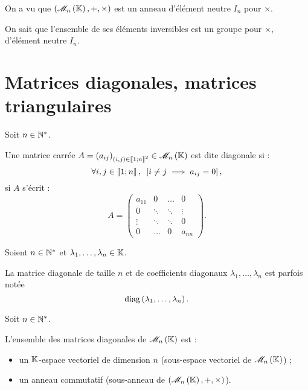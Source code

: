 \begin{dem}
On a vu que \(\anneau{\M{n}}\) est un anneau d'élément neutre \(I_n\) pour \(\times\).

On sait que l'ensemble de ses éléments inversibles est un groupe pour \(\times\), d'élément neutre \(I_n\).
\end{dem}

\section{Matrices diagonales, matrices triangulaires}

\begin{defi}
Soit \(n\in\mathbb{N}^*\).

Une matrice carrée \(A=\paren{a_{ij}}_{\paren{i,j}\in\interventierii{1}{n}^2}\in\M{n}\) est dite diagonale si : \[\quantifs{\forall i,j\in\interventierii{1}{n}}\croch{i\not=j\imp a_{ij}=0},\] \cad si \(A\) s'écrit : \[A=\begin{pmatrix}
a_{11} & 0 & \dots & 0 \\
0 & \ddots & \ddots & \vdots \\
\vdots & \ddots & \ddots & 0 \\
0 & \dots & 0 & a_{nn}
\end{pmatrix}.\]
\end{defi}

\begin{nota}
Soient \(n\in\mathbb{N}^*\) et \(\lambda_1,\dots,\lambda_n\in\mathbb{K}\).

La matrice diagonale de taille \(n\) et de coefficients diagonaux \(\lambda_1,\dots,\lambda_n\) est parfois notée \[\operatorname{diag}\left(\lambda_1,\dots,\lambda_n\right).\]
\end{nota}

\begin{prop}
Soit \(n\in\mathbb{N}^*\).

L'ensemble des matrices diagonales de \(\M{n}\) est :

\begin{itemize}
\item un \(\mathbb{K}\)-espace vectoriel de dimension \(n\) (sous-espace vectoriel de \(\M{n}\)) ; \\

\item un anneau commutatif (sous-anneau de \(\anneau{\M{n}}\)).
\end{itemize}
\end{prop}

